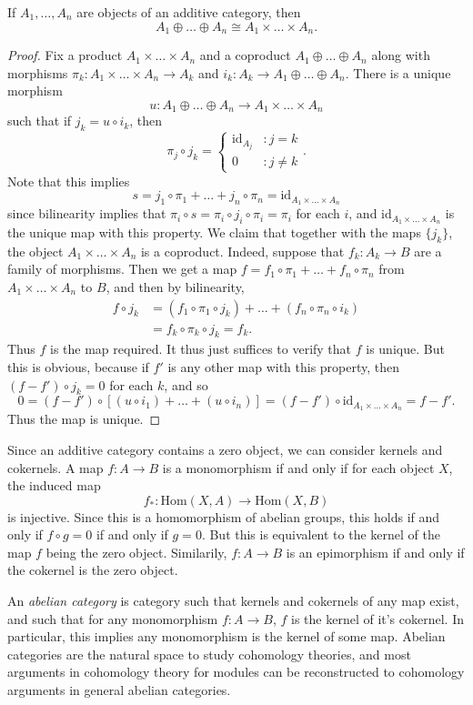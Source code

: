 \begin{lemma}
    If $A_1, \dots, A_n$ are objects of an additive category, then
    \[ A_1 \oplus \dots \oplus A_n \cong A_1 \times \dots \times A_n. \]
\end{lemma}
\begin{proof}
    Fix a product $A_1 \times \dots \times A_n$ and a coproduct $A_1 \oplus \dots \oplus A_n$ along with morphisms $\pi_k: A_1 \times \dots \times A_n \to A_k$ and $i_k: A_k \to A_1 \oplus \dots \oplus A_n$. There is a unique morphism
    \[ u: A_1 \oplus \dots \oplus A_n \to A_1 \times \dots \times A_n \]
    such that if $j_k = u \circ i_k$, then
    \[ \pi_j \circ j_k = \begin{cases} \text{id}_{A_j} &: j = k \\ 0 &: j \neq k \end{cases}. \]
    Note that this implies
    \[ s = j_1 \circ \pi_1 + \dots + j_n \circ \pi_n = \text{id}_{A_1 \times \dots \times A_n} \]
    since bilinearity implies that $\pi_i \circ s = \pi_i \circ j_i \circ \pi_i = \pi_i$ for each $i$, and $\text{id}_{A_1 \times \dots \times A_n}$ is the unique map with this property. We claim that together with the maps $\{ j_k \}$, the object $A_1 \times \dots \times A_n$ is a coproduct. Indeed, suppose that $f_k: A_k \to B$ are a family of morphisms. Then we get a map $f = f_1 \circ \pi_1 + \dots + f_n \circ \pi_n$ from $A_1 \times \dots \times A_n$ to $B$, and then by bilinearity,
    \begin{align*}
        f \circ j_k &= (f_1 \circ \pi_1 \circ j_k) + \dots + (f_n \circ \pi_n \circ i_k)\\
        &= f_k \circ \pi_k \circ j_k = f_k.
    \end{align*}
    Thus $f$ is the map required. It thus just suffices to verify that $f$ is unique. But this is obvious, because if $f'$ is any other map with this property, then $(f - f') \circ j_k = 0$ for each $k$, and so
    \[ 0 = (f - f') \circ [(u \circ i_1) + \dots + (u \circ i_n)] = (f - f') \circ \text{id}_{A_1 \times \dots \times A_n} = f - f'. \]
    Thus the map is unique.
\end{proof}

Since an additive category contains a zero object, we can consider kernels and cokernels. A map $f: A \to B$ is a monomorphism if and only if for each object $X$, the induced map
%
\[ f_*: \text{Hom}(X,A) \to \text{Hom}(X,B) \]
%
is injective. Since this is a homomorphism of abelian groups, this holds if and only if $f \circ g = 0$ if and only if $g = 0$. But this is equivalent to the kernel of the map $f$ being the zero object. Similarily, $f: A \to B$ is an epimorphism if and only if the cokernel is the zero object.

An \emph{abelian category} is category such that kernels and cokernels of any map exist, and such that for any monomorphism $f: A \to B$, $f$ is the kernel of it's cokernel. In particular, this implies any monomorphism is the kernel of some map. Abelian categories are the natural space to study cohomology theories, and most arguments in cohomology theory for modules can be reconstructed to cohomology arguments in general abelian categories.

